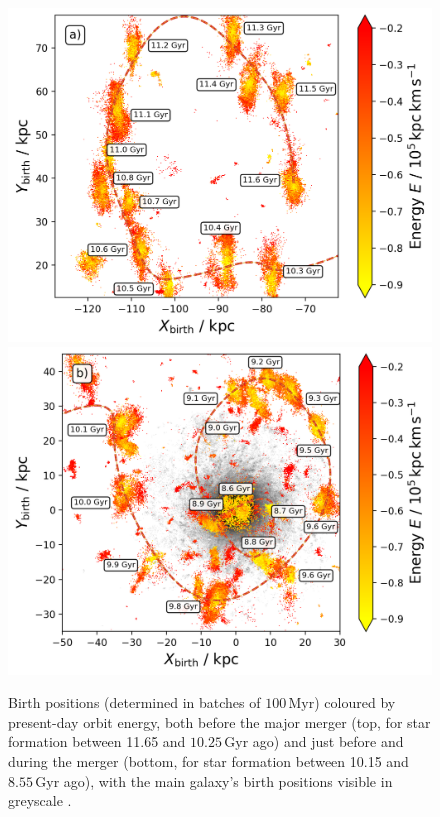 \documentclass[fleqn,usenatbib]{mnras}
\begin{document}
\begin{figure}
    \centering
    \includegraphics[width=\columnwidth]{figures/fellowship.png}
    \includegraphics[width=\columnwidth]{figures/mount_doom.png}
    \caption{Birth positions (determined in batches of $100\,\mathrm{Myr}$) coloured by present-day orbit energy, both before the major merger (top, for star formation between 11.65 and $10.25\,\mathrm{Gyr}$ ago) and just before and during the merger (bottom, for star formation between 10.15 and $8.55\,\mathrm{Gyr}$ ago), with the main galaxy's birth positions visible in greyscale \href{https://github.com/svenbuder/gse_nihaouhd/tree/main/figures}{\faGithub}.}
    \label{fig:fellowship_and_mount_doom}
\end{figure}
\end{document}

